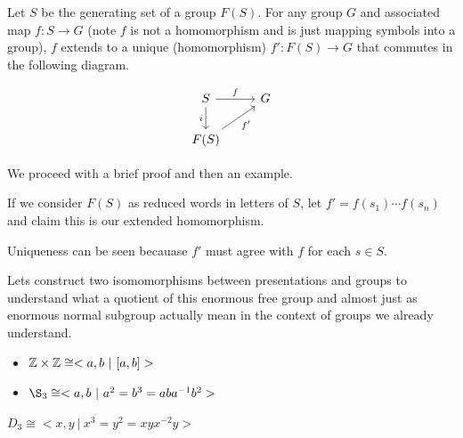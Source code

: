\documentclass[10pt]{article}
\begin{document}
\begin{note}
Let $S$ be the generating set of a group $F(S)$. For any group $G$ and associated
map $f: S \to G$ (note $f$ is not a homomorphism and is just mapping symbols
into a group), $f$ extends to a unique (homomorphism) $f': F(S) \to G$ that commutes in the following diagram.

\[
\begin{tikzcd}
S \arrow[r, "f"] \arrow[d, "i"'] & G \\
F(S) \arrow[ru, "f'"']           &  
\end{tikzcd}
\]

We proceed with a brief proof and then an example.

If we consider $F(S)$ as reduced words in letters of $S$, let $f' =
f(s_1)\cdots f(s_n)$ and claim this is our extended homomorphism.

Uniqueness can be seen becauase $f'$ must agree with $f$ for each $s \in S$.

\end{note}

Lets construct two isomomorphisms between presentations and groups to understand
what a quotient of this enormous free group and almost just as enormous normal
subgroup actually mean in the context of groups we already understand.

\begin{itemize}
	\item{$\mathbb{Z} \times \mathbb{Z} \cong <a,b~|~[a,b]>$}
	\item{$\S_3 \cong <a,b~|~a^2=b^3=aba^{-1}b^2>$}
\end{itemize}

\begin{proposition}
	$D_3 \cong <x,y~|~x^3=y^2=xyx^{-2}y>$
\end{proposition}
\end{document}
